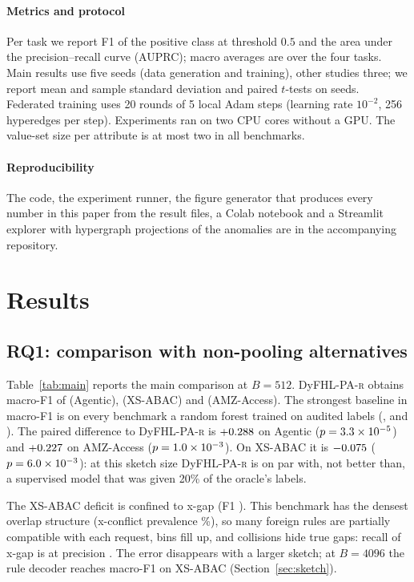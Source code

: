 \documentclass[preprint,12pt]{elsarticle}
\theoremstyle{definition}
\newcommand{\name}{DyFHL-PA\xspace}
\newcommand{\R}{\textsc{r}}
\begin{document}
\paragraph{Metrics and protocol} Per task we report F1 of the positive class at threshold $0.5$ and the area under the precision--recall curve (AUPRC); macro averages are over the four tasks. Main results use five seeds (data generation and training), other studies three; we report mean and sample standard deviation and paired $t$-tests on seeds. Federated training uses 20 rounds of 5 local Adam steps (learning rate $10^{-2}$, 256 hyperedges per step). Experiments ran on two CPU cores without a GPU. The value-set size per attribute is at most two in all benchmarks.

\paragraph{Reproducibility} The code, the experiment runner, the figure generator that produces every number in this paper from the result files, a Colab notebook and a Streamlit explorer with hypergraph projections of the anomalies are in the accompanying repository.

\section{Results}
\label{sec:results}

\subsection{RQ1: comparison with non-pooling alternatives}
Table~\ref{tab:main} reports the main comparison at $B=512$. \name-\R{} obtains macro-F1 of \mainagenticR{} (Agentic), \mainxustollerR{} (XS-ABAC) and \mainamazonR{} (AMZ-Access). The strongest baseline in macro-F1 is on every benchmark a random forest trained on audited labels (\mainagenticbest, \mainxustollerbest{} and \mainamazonbest). The paired difference to \name-\R{} is $+0.288$ on Agentic ($p=3.3\times10^{-5}$) and $+0.227$ on AMZ-Access ($p=1.0\times10^{-3}$). On XS-ABAC it is $-0.075$ ($p=6.0\times10^{-3}$): at this sketch size \name-\R{} is on par with, not better than, a supervised model that was given 20\% of the oracle's labels.

The XS-ABAC deficit is confined to x-gap (F1 \mainxustollerRgap). This benchmark has the densest overlap structure (x-conflict prevalence \prevxustollercon\%), so many foreign rules are partially compatible with each request, bins fill up, and collisions hide true gaps: recall of x-gap is \mainxustollerRgaprec{} at precision \mainxustollerRgapprec. The error disappears with a larger sketch; at $B=4096$ the rule decoder reaches macro-F1 \skxustollerruleBmmmmxcvi{} on XS-ABAC (Section~\ref{sec:sketch}).
\end{document}
